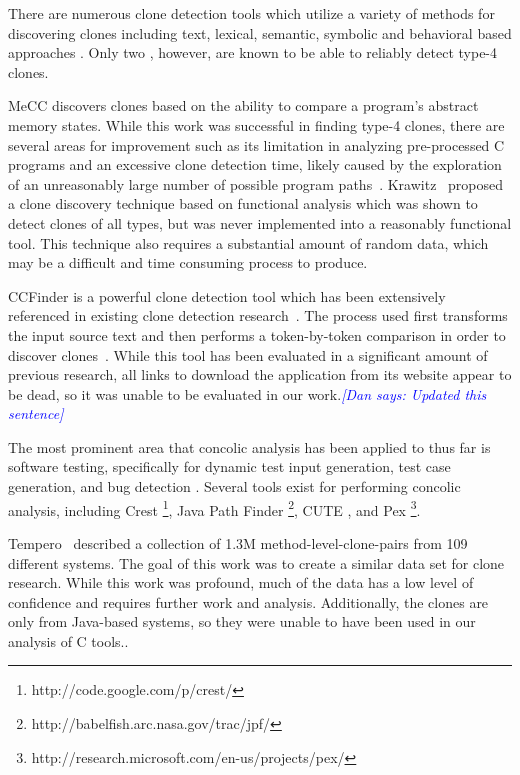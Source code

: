 \documentclass[smallextended]{svjour3}       %
\newcommand{\dan}[1]{\textcolor{blue}{{\it [Dan says: #1]}}}
\begin{document}




There are numerous clone detection tools which utilize a variety of methods for discovering clones including text, lexical, semantic, symbolic and behavioral based approaches \cite{Roy:2009:CEC:1530898.1531101}. Only two , however, are known to be able to reliably detect type-4 clones.

MeCC discovers clones based on the ability to compare a program's abstract memory states. While this work was successful in finding type-4 clones, there are several areas for improvement such as its limitation in analyzing pre-processed C programs and an excessive clone detection time, likely caused by the exploration of an unreasonably large number of possible program paths~\cite{Kim:2011:MMC:1985793.1985835}. Krawitz~\cite{Kraw2012} proposed a clone discovery technique based on functional analysis which was shown to detect clones of all types, but was never implemented into a reasonably functional tool. This technique also requires a substantial amount of random data, which may be a difficult and time consuming process to produce.

CCFinder is a powerful clone detection tool which has been extensively referenced in existing clone detection research~\cite{Kamiya:2001:MST:381473.381749,Choi:2011:ECC:1985404.1985407,Hotta:2010:DCM:1862372.1862390}. The process used first transforms the input source text and then performs a token-by-token comparison in order to discover clones~\cite{Kamiya:2002:CMT:636188.636191}. While this tool has been evaluated in a significant amount of previous research, all links to download the application from its website appear to be dead, so it was unable to be evaluated in our work.\dan{Updated this sentence}

The most prominent area that concolic analysis has been applied to thus far is software testing, specifically for dynamic test input generation, test case generation, and bug detection \cite{Wassermann:2008:DTI:1390630.1390661, Sen:2005:CCU:1081706.1081750, Kim:2012:IAC:2337223.2337373}. Several tools exist for performing concolic analysis, including Crest \footnote{http://code.google.com/p/crest/}, Java Path Finder \footnote{http://babelfish.arc.nasa.gov/trac/jpf/}, CUTE \cite{Sen:2005:CCU:1081706.1081750}, and Pex \footnote{http://research.microsoft.com/en-us/projects/pex/}.

Tempero~\cite{IWSC13p53} described a collection of 1.3M method-level-clone-pairs from 109 different systems. The goal of this work was to create a similar data set for clone research. While this work was profound, much of the data has a low level of confidence and requires further work and analysis. Additionally, the clones are only from Java-based systems, so they were unable to have been used in our analysis of C tools..
\end{document}
